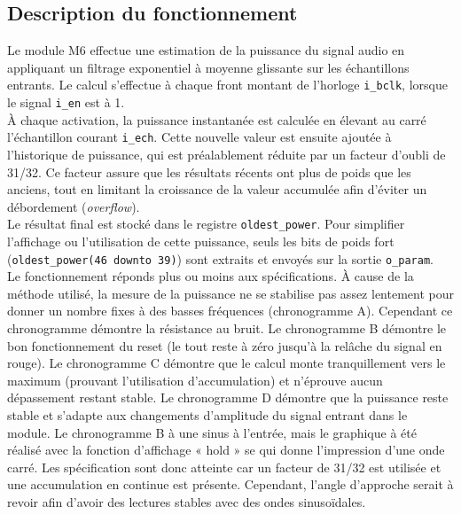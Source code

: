 

\subsection{Description du fonctionnement}

Le module M6 effectue une estimation de la puissance du signal audio en
appliquant un filtrage exponentiel à moyenne glissante sur les échantillons
entrants. Le calcul s'effectue à chaque front montant de l'horloge
\verb|i_bclk|, lorsque le signal \verb|i_en| est à 1. \\

À chaque activation, la puissance instantanée est calculée en élevant au
carré l'échantillon courant \verb|i_ech|. Cette nouvelle valeur est ensuite
ajoutée à l'historique de puissance, qui est préalablement réduite par un
facteur d'oubli de 31/32. Ce facteur assure que les résultats récents ont
plus de poids que les anciens, tout en limitant la croissance de la valeur
accumulée afin d'éviter un débordement (\emph{overflow}). \\

Le résultat final est stocké dans le registre \verb|oldest_power|. Pour
simplifier l'affichage ou l'utilisation de cette puissance, seuls les bits de
poids fort (\verb|oldest_power(46 downto 39)|) sont extraits et envoyés sur
la sortie \verb|o_param|. \\

Le fonctionnement réponds plus ou moins aux spécifications. À cause de la méthode utilisé, la mesure de la puissance ne se stabilise pas assez lentement pour donner un nombre fixes à des basses fréquences (chronogramme A). Cependant ce chronogramme démontre la résistance au bruit. Le chronogramme B démontre le bon fonctionnement du reset (le tout reste à zéro jusqu’à la relâche du signal en rouge). Le chronogramme C démontre que le calcul monte tranquillement vers le maximum (prouvant l'utilisation d'accumulation) et n'éprouve aucun dépassement restant stable. Le chronogramme D démontre que la puissance reste stable et s'adapte aux changements d'amplitude du signal entrant dans le module. Le chronogramme B à une sinus à l'entrée, mais le graphique à été réalisé avec la fonction d'affichage « hold » se qui donne l'impression d'une onde carré. Les spécification sont donc atteinte car un facteur de 31/32 est utilisée et une accumulation en continue est présente. Cependant, l'angle d'approche serait à revoir afin d'avoir des lectures stables avec des ondes sinusoïdales.


